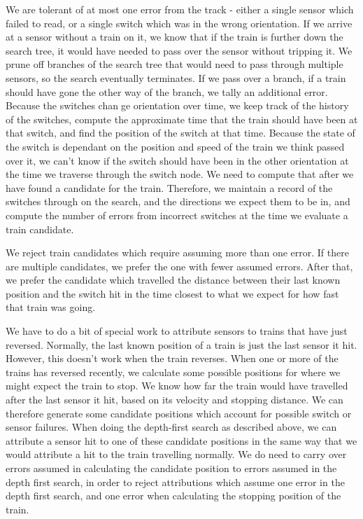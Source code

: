 \documentclass{article}
\begin{document}
We are tolerant of at most one error from the track - either a single sensor which failed to read, or a single switch which
was in the wrong orientation.
If we arrive at a sensor without a train on it, we know that if the train is further down the search tree, it
would have needed to pass over the sensor without tripping it.
We prune off branches of the search tree that would need to pass through multiple sensors, so the search eventually terminates.
If we pass over a branch, if a train should have gone the other way of the branch, we tally an additional error.
Because the switches change orientation over time, we keep track of the history of the switches, compute the approximate
time that the train should have been at that switch, and find the position of the switch at that time.
Because the state of the switch is dependant on the position and speed of the train we think passed over it, we can't know
if the switch should have been in the other orientation at the time we traverse through the switch node.
We need to compute that after we have found a candidate for the train.
Therefore, we maintain a record of the switches through on the search, and the directions we expect them to be in,
and compute the number of errors from incorrect switches at the time we evaluate a train candidate.

We reject train candidates which require assuming more than one error.
If there are multiple candidates, we prefer the one with fewer assumed errors.
After that, we prefer the candidate which travelled the distance between their last known position and the switch hit
in the time closest to what we expect for how fast that train was going.

We have to do a bit of special work to attribute sensors to trains that have just reversed.
Normally, the last known position of a train is just the last sensor it hit.
However, this doesn't work when the train reverses.
When one or more of the trains has reversed recently, we calculate some possible positions for where
we might expect the train to stop.
We know how far the train would have travelled after the last sensor it hit, based on its velocity and stopping
distance.
We can therefore generate some candidate positions which account for possible switch or sensor failures.
When doing the depth-first search as described above, we can attribute a sensor hit to one of these
candidate positions in the same way that we would attribute a hit to the train travelling normally.
We do need to carry over errors assumed in calculating the candidate position to errors assumed in
the depth first search, in order to reject attributions which assume one error in the depth first search,
and one error when calculating the stopping position of the train.
\end{document}
